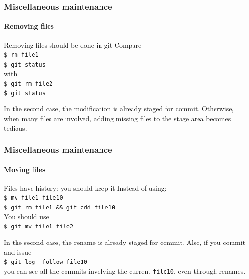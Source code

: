 \begin{frame}
\frametitle{Miscellaneous maintenance}
\framesubtitle{Removing files}

\begin{block}{Removing files should be done in git}
Compare \\
\texttt{\$ rm file1} \\
\texttt{\$ git status} \\
with \\
\texttt{\$ git rm file2} \\
\texttt{\$ git status} 

\medskip
In the second case, the modification is already staged for commit. Otherwise, when many files are involved, adding missing files to the stage area becomes tedious.
\end{block}

\end{frame}

\begin{frame}
\frametitle{Miscellaneous maintenance}
\framesubtitle{Moving files}

\begin{block}{Files have history: you should keep it}
Instead of using: \\
\texttt{\$ mv file1 file10} \\
\texttt{\$ git rm file1 \&\& git add file10} \\
You should use: \\
\texttt{\$ git mv file1 file2}

\medskip
In the second case, the rename is already staged for commit. Also, if you commit and issue \\
\texttt{\$ git log ---follow file10} \\
you can see all the commits involving the current \texttt{file10}, even through renames.
\end{block}

\end{frame}

